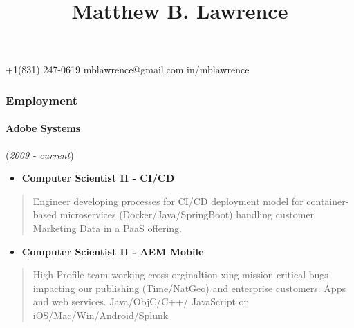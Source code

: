 \documentclass[8pt, a4paper]{article}
\title{Matthew B. Lawrence\vspace{-1.75ex}} %
\date{} %
\newcommand*\circled[1]{\tikz[baseline=(char.base)]{
            \node[shape=circle,draw,inner sep=1pt] (char) {#1};}}
\providecommand{\tightlist}{%
  \setlength{\itemsep}{0pt}\setlength{\parskip}{0pt}}
\begin{document}
\maketitle{}
\vspace{-14.5ex} %
\centerline{
\circled{\faPhone} +1(831) 247-0619 
\textbullet\hspace{0.003cm}
\circled{\faEnvelopeO}  mblawrence@gmail.com 
\textbullet\hspace{0.003cm}
\circled{\faLinkedin} in/mblawrence
}
\begin{multicols}{2}
\begin{small}
\begin{raggedright}
\hypertarget{employment}{%
\subsubsection{Employment}\label{employment}}

\hypertarget{adobe-systems}{%
\paragraph{\texorpdfstring{\textbf{Adobe
Systems}}{Adobe Systems}}\label{adobe-systems}}

(\emph{2009 - current})

\begin{itemize}
\tightlist
\item
  \textbf{Computer Scientist II - CI/CD}
\end{itemize}

\begin{quote}
Engineer developing processes for CI/CD deployment model for
container-based microservices (Docker/Java/SpringBoot) handling customer
Marketing Data in a PaaS offering.
\end{quote}

\begin{itemize}
\tightlist
\item
  \textbf{Computer Scientist II - AEM Mobile}
\end{itemize}

\begin{quote}
High Profile team working cross-orginaltion xing mission-critical bugs
impacting our publishing (Time/NatGeo) and enterprise customers. Apps
and web services. Java/ObjC/C++/ JavaScript on
iOS/Mac/Win/Android/Splunk
\end{quote}


\end{raggedright}
\end{small}
\end{multicols}
\end{document}
